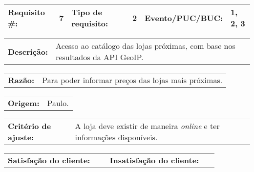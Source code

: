 
\par \noindent
\begin{table}[h]
    \begin{tabularx}{\textwidth}{
        p{}
        p{}
        p{}
        p{}
        p{}
        p{}
    }
    \toprule
        \textbf{Requisito \#:}          & 7
        & \textbf{Tipo de requisito:}   & 2
        & \textbf{Evento/PUC/BUC:}      & 1, 2, 3 \\
    \midrule
    \end{tabularx}
    \vspace{5pt}
    \begin{tabularx}{\textwidth}{p{}  p{}}
        \textbf{Descrição:} &
        Acesso ao catálogo das lojas próximas, com base nos resultados 
        da API GeoIP.
    \end{tabularx}
    
    \vspace{5pt}
    \begin{tabularx}{\textwidth}{p{}  p{}}
        \textbf{Razão:} &
         Para poder informar preços das lojas mais próximas.
    \end{tabularx}
    
    \vspace{5pt}
    \begin{tabularx}{\textwidth}{p{} p{}}
        \textbf{Origem:} &
        Paulo.
    \end{tabularx}
    
    \vspace{5pt}
    \begin{tabularx}{\textwidth}{p{} p{}}
        \textbf{Critério de ajuste:} &
        A loja deve existir de maneira \emph{online} e ter informações 
        disponíveis.
    \end{tabularx}
    
    \vspace{5pt}
    \begin{tabularx}{\textwidth}{p{}p{}
                                 p{}p{}}
        \textbf{Satisfação do cliente:} & -- & 
        \textbf{Insatisfação do cliente:} & --
    \end{tabularx}
    

\end{table}
